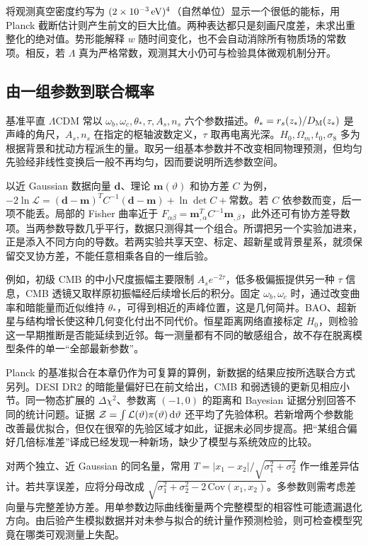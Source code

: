 将观测真空密度约写为 $(2\times10^{-3}\,{\rm eV})^4$（自然单位）显示一个很低的能标，用 Planck 截断估计则产生前文的巨大比值。两种表达都只是刻画尺度差，未求出重整化的绝对值。势形能解释 $w$ 随时间变化，也不会自动消除所有物质场的常数项。相反，若 $\Lambda$ 真为严格常数，观测其大小仍可与检验具体微观机制分开。

\subsection{由一组参数到联合概率}

基准平直 $\Lambda$CDM 常以 $\omega_b,\omega_c,\theta_*,\tau,A_s,n_s$ 六个参数描述。$\theta_*=r_s(z_*)/D_{\rm M}(z_*)$ 是声峰的角尺，$A_s,n_s$ 在指定的枢轴波数定义，$\tau$ 取再电离光深。$H_0,\Omega_m,t_0,\sigma_8$ 多为根据背景和扰动方程派生的量。取另一组基本参数并不改变相同物理预测，但均匀先验经非线性变换后一般不再均匀，因而要说明所选参数空间。

以近 Gaussian 数据向量 $\bm d$、理论 $\bm m(\vartheta)$ 和协方差 $C$ 为例，$-2\ln\mathcal L=(\bm d-\bm m)^TC^{-1}(\bm d-\bm m)+\ln\det C+\text{常数}$。若 $C$ 依参数而变，后一项不能丢。局部的 Fisher 曲率近于 $F_{\alpha\beta}=\bm m_{,\alpha}^TC^{-1}\bm m_{,\beta}$，此外还可有协方差导数项。当两参数导数几乎平行，数据只测得其一个组合。所谓把另一个实验加进来，正是添入不同方向的导数。若两实验共享天空、标定、超新星或背景星系，就须保留交叉协方差，不能任意相乘各自的一维后验。

例如，初级 CMB 的中小尺度振幅主要限制 $A_s e^{-2\tau}$，低多极偏振提供另一种 $\tau$ 信息，CMB 透镜又取样原初振幅经后续增长后的积分。固定 $\omega_b,\omega_c$ 时，通过改变曲率和暗能量而近似维持 $\theta_*$，可得到相近的声峰位置，这是几何简并。BAO、超新星与结构增长使这种几何变化付出不同代价。恒星距离网络直接标定 $H_0$，则检验这一早期推断是否能延续到近邻。每一测量都有不同的敏感组合，故不存在脱离模型条件的单一“全部最新参数”。

Planck 的基准拟合在本章仍作为可复算的算例，新数据的结果应按所选联合方式另列。DESI DR2 的暗能量偏好已在前文给出，CMB 和弱透镜的更新见相应小节。同一物态扩展的 $\Delta\chi^2$、参数离 $(-1,0)$ 的距离和 Bayesian 证据分别回答不同的统计问题。证据 $\mathcal Z=\int\mathcal L(\vartheta)\pi(\vartheta)\,\dd\vartheta$ 还平均了先验体积。若新增两个参数能改善最优拟合，但仅在很窄的先验区域才如此，证据未必同步提高。把“某组合偏好几倍标准差”译成已经发现一种新场，缺少了模型与系统效应的比较。

对两个独立、近 Gaussian 的同名量，常用 $T=|x_1-x_2|/\sqrt{\sigma_1^2+\sigma_2^2}$ 作一维差异估计。若共享误差，应将分母改成 $\sqrt{\sigma_1^2+\sigma_2^2-2\,\mathrm{Cov}(x_1,x_2)}$。多参数则需考虑差向量与完整差协方差。用单参数边际曲线衡量两个完整模型的相容性可能遗漏退化方向。由后验产生模拟数据并对未参与拟合的统计量作预测检验，则可检查模型究竟在哪类可观测量上失配。

